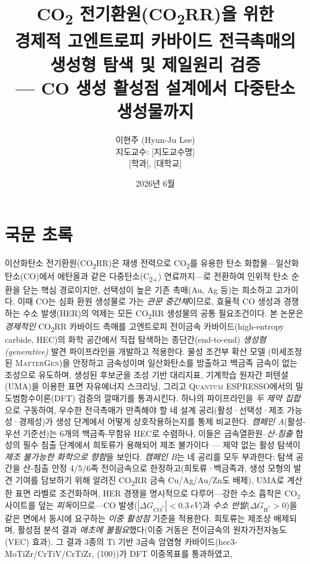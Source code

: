 \documentclass[11pt,a4paper]{report}
\title{\bfseries CO\textsubscript{2} 전기환원(CO\textsubscript{2}RR)을 위한\\
경제적 고엔트로피 카바이드 전극촉매의\\
생성형 탐색 및 제일원리 검증\\[2pt]
\normalsize\mdseries --- CO 생성 활성점 설계에서 다중탄소 생성물까지}
\author{이현주 (Hyun-Ju Lee)\\[4pt]
\small 지도교수: [지도교수명]\\
\small [학과], [대학교]}
\date{2026년 6월}
\providecommand{\SI}[2]{#1\,#2}
\newcommand{\dGCO}{\Delta G_{\mathrm{CO^*}}}
\newcommand{\dGH}{\Delta G_{\mathrm{H^*}}}
\begin{document}
\maketitle

\chapter*{국문 초록}
이산화탄소 전기환원(CO\textsubscript{2}RR)은 재생 전력으로 CO\textsubscript{2}를 유용한 탄소
화합물---일산화탄소(CO)에서 에탄올과 같은 다중탄소(C\textsubscript{2+}) 연료까지---로 전환하여
인위적 탄소 순환을 닫는 핵심 경로이지만, 선택성이 높은 기존 촉매(Au, Ag 등)는 희소하고
고가이다. 이때 CO는 심화 환원 생성물로 가는 \emph{관문 중간체}이므로, 효율적 CO 생성과 경쟁하는
수소 발생(HER)의 억제는 모든 CO\textsubscript{2}RR 생성물의 공통 필요조건이다. 본 논문은
\emph{경제적인} CO\textsubscript{2}RR 카바이드 촉매를 고엔트로피 전이금속
카바이드(high-entropy carbide, HEC)의 화학 공간에서 직접 탐색하는 종단간(end-to-end)
\emph{생성형(generative)} 발견 파이프라인을 개발하고 적용한다. 물성 조건부 확산 모델
(미세조정된 \textsc{MatterGen})을 안정하고 금속성이며 일산화탄소를 방출하고 백금족 금속이
없는 조성으로 유도하며, 생성된 후보군을 조성 기반 대리지표, 기계학습 원자간 퍼텐셜(UMA)을
이용한 표면 자유에너지 스크리닝, 그리고 \textsc{Quantum ESPRESSO}에서의 밀도범함수이론(DFT)
검증의 깔때기를 통과시킨다. 하나의 파이프라인을 \emph{두 제약 집합}으로 구동하여, 우수한
전극촉매가 만족해야 할 네 설계 공리(활성·선택성·제조 가능성·경제성)가 생성 단계에서 어떻게
상호작용하는지를 통제 비교한다. \emph{캠페인 A}(활성-우선 기준선)는 6개의 백금족-무함유 HEC로
수렴하나, 이들은 금속열환원--\emph{산-침출} 합성의 필수 침출 단계에서 희토류가 용해되어 제조
불가이다 --- 제약 없는 활성 탐색이 \emph{제조 불가능한 화학으로 향함}을 보인다. \emph{캠페인 B}는
네 공리를 모두 부과한다: 탐색 공간을 산-침출 안정 4/5/6족 전이금속으로 한정하고(희토류·백금족과,
생성 모형의 발견 기여를 담보하기 위해 알려진 CO\textsubscript{2}RR 금속 Cu/Ag/Au/Zn도 배제),
UMA로 계산한 표면 라벨로 조건화하며, HER 경쟁을 명시적으로 다루어---강한 수소 흡착은 CO$_2$
사이트를 덮는 \emph{피독}이므로---CO 발생($|\dGCO|<\SI{0.3}{eV}$)과 \emph{수소 반발}($\dGH>0$)을
같은 면에서 동시에 요구하는 \emph{이중 활성점} 기준을 적용한다. 희토류는 제조상 배제되며, 활성점
분석 결과 \emph{애초에 불필요}했다(이중 거동은 전이금속의 원자가전자농도(VEC) 효과). 그 결과
3종의 Ti 기반 3금속 암염형 카바이드(hec3-MoTiZr/CrTiV/CrTiZr, (100))가 DFT 이중목표를 통과하였고,
\end{document}

